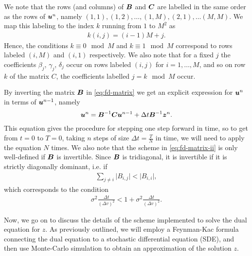 \documentclass{article}  %
\begin{document}
We note that the rows (and columns) of $\boldsymbol{B}$ and $\boldsymbol{C}$ are labelled in the same order as the rows of $\boldsymbol{u}^n$, namely $(1,1),(1,2),\dots,(1,M),(2,1),\dots(M,M)$. We map this labeling to the index $k$ running from $1$ to $M^2$ as 
%
\begin{align}
    k(i,j) = (i-1)M + j.
\end{align}
%
Hence, the conditions $k\equiv 0 \mod M$ and $k\equiv 1 \mod M$ correspond to rows labeled $(i,M)$ and $(i,1)$ respectively. We also note that for a fixed $j$ the coefficients $\beta_j$, $\gamma_j$, $\delta_j$ occur on rows labeled $(i,j)$ for $i=1,\dots,M$, and so on row $k$ of the matrix $C$, the coefficients labelled $j = k \mod M$ occur.

By inverting the matrix $\boldsymbol{B}$ in \autoref{eq:fd-matrix} we get an explicit expression for $\boldsymbol{u}^n$ in terms of $\boldsymbol{u}^{n-1}$, namely
%
\begin{align} 
    \label{eq:fd-matrix-ii}
    \boldsymbol{u}^n = \boldsymbol{B}^{-1}\boldsymbol{C}\boldsymbol{u}^{n-1} + \Delta t \boldsymbol{B}^{-1}\boldsymbol{z}^n.
\end{align}
%
This equation gives the procedure for stepping one step forward in time, so to get from $t=0$ to $T=0$, taking $n$ steps of size $\Delta t = \frac{T}{N}$ in time, we will need to apply the equation $N$ times. We also note that the scheme in \autoref*{eq:fd-matrix-ii} is only well-defined if $\boldsymbol{B}$ is invertible. Since $\boldsymbol{B}$ is tridiagonal, it is invertible if it is strictly diagonally dominant, i.e. if
%
\begin{align} 
    \sum_{j\neq i} \lvert B_{i,j} \rvert < \lvert B_{i,i} \rvert,  
\end{align}
%
which corresponds to the condition 
%
\begin{align}
    \sigma^2 \frac{\Delta t}{(\Delta v)^2} < 1 + \sigma^2 \frac{\Delta t}{(\Delta v)^2}.
\end{align}
%

Now, we go on to discuss the details of the scheme implemented to solve the dual equation for $z$. As previously outlined, we will employ a Feynman-Kac formula connecting the dual equation to a stochastic differential equation (SDE), and then use Monte-Carlo simulation to obtain an approximation of the solution $z$.
\end{document}
